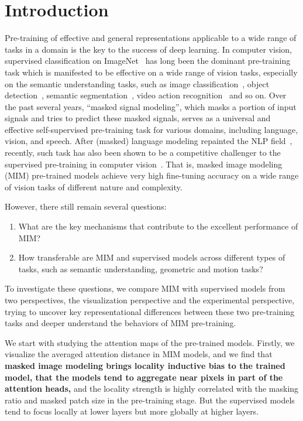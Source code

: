 \documentclass{article}
\begin{document}
\section{Introduction}
Pre-training of effective and general representations applicable to a wide range of tasks in a domain is the key to the success of deep learning. 
In computer vision, supervised classification on ImageNet~\cite{deng2009imagenet} has long been the dominant pre-training task which is manifested to be effective on a wide range of vision tasks, especially on the semantic understanding tasks, such as image classification~\cite{donahue2014decaf,kornblith2019better,alex2019big,dosovitskiy2020vit,liu2021swin}, object detection~\cite{sermanet2013overfeat,girshick2014rich,ren2015faster,Mask-rcnn}, semantic segmentation~\cite{long2015fully,wang2018non}, video action recognition~\cite{simonyan2014two,tran2015learning,carreira2017quo,liu2021video} and so on.
Over the past several years, “masked signal modeling”, which masks a portion of input signals and tries to predict these masked signals, serves as a universal and effective self-supervised pre-training task for various domains, including language, vision, and speech.
After (masked) language modeling repainted the NLP field~\cite{devlin2018bert,liu2019roberta}, recently, such task has also been shown to be a competitive challenger to the supervised pre-training in computer vision~\cite{chen2020imagegpt,dosovitskiy2020vit,bao2021beit,he2021masked,zhou2021ibot,xie2021simmim}. That is, masked image modeling (MIM) pre-trained models achieve very high fine-tuning accuracy on a wide range of vision tasks of different nature and complexity.

However, there still remain several questions:
\begin{enumerate}
    \item What are the key mechanisms that contribute to the excellent performance of MIM?
    \item How transferable are MIM and supervised models across different types of tasks, such as semantic understanding, geometric and motion tasks?
\end{enumerate}
To investigate these questions, we compare MIM with supervised models from two perspectives, the visualization perspective and the experimental perspective, trying to uncover key representational differences between these two pre-training tasks and deeper understand the behaviors of MIM pre-training.


We start with studying the attention maps of the pre-trained models.
Firstly, we visualize the averaged attention distance in MIM models, and we find that \textbf{masked image modeling brings locality inductive bias to the trained model, that the models tend to aggregate near pixels in part of the attention heads,} and the locality strength is highly correlated with the masking ratio and masked patch size in the pre-training stage. But the supervised models tend to focus locally at lower layers but more globally at higher layers. 
\end{document}
